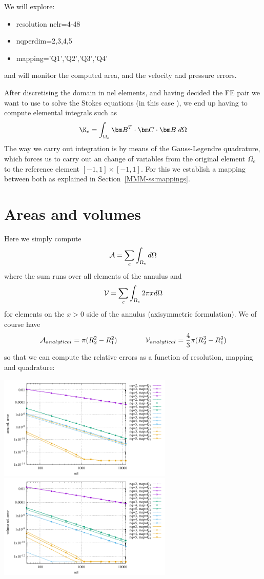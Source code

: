 We will explore:
\begin{itemize}
\item resolution {\python nelr=4-48}
\item {\python nqperdim=2,3,4,5}
\item {\python mapping='Q1','Q2','Q3','Q4'}
\end{itemize}
and will monitor the computed area, and the velocity and pressure errors.

After discretising the domain in {\python nel} elements, and having decided the FE
pair we want to use to solve the Stokes equations (in this case \QtwoQone), we end up 
having to compute elemental integrals such as 
\[
\K_e = \int_{\Omega_e} {\bm B}^T\cdot {\bm C} \cdot {\bm B} \; d\Omega
\]
The way we carry out integration is by means of the Gauss-Legendre quadrature, which 
forces us to carry out an change of variables from the original element $\Omega_e$ 
to the reference element $[-1,1]\times [-1,1]$. For this we establish a mapping between both 
as explained in Section~\ref{MMM-ss:mappings}.



\section*{Areas and volumes}

Here we simply compute 
\[
{\cal A} = \sum_e \int_{\Omega_e} d\Omega
\]
where the sum runs over all elements of the annulus
and 
\[
{\cal V} = \sum_e \int_{\Omega_e} 2\pi x d\Omega
\]
for elements on the $x>0$ side of the annulus (axisymmetric formulation).
We of course have 
\[
{\cal A}_{analytical} = \pi (R_2^2-R_1^2)
\qquad\qquad
{\cal V}_{analytical} = \frac43 \pi (R_2^3-R_1^3)
\]
so that we can compute the relative errors as a function of resolution, mapping and quadrature: 
\begin{center}
\includegraphics[width=8.3cm]{python_codes/fieldstone_152/results/areas/areas.pdf}
\includegraphics[width=8.3cm]{python_codes/fieldstone_152/results/areas/volumes.pdf}
\end{center}

